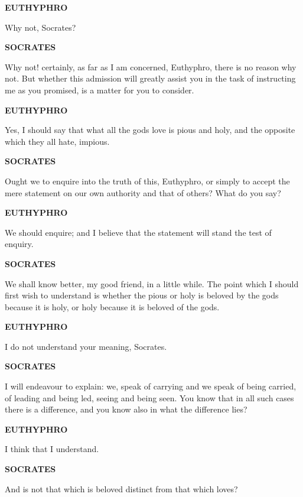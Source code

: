 \documentclass[11pt,letter]{article}
\begin{document}
\par \textbf{EUTHYPHRO}
\par   Why not, Socrates?

\par \textbf{SOCRATES}
\par   Why not! certainly, as far as I am concerned, Euthyphro, there is no reason why not. But whether this admission will greatly assist you in the task of instructing me as you promised, is a matter for you to consider.

\par \textbf{EUTHYPHRO}
\par   Yes, I should say that what all the gods love is pious and holy, and the opposite which they all hate, impious.

\par \textbf{SOCRATES}
\par   Ought we to enquire into the truth of this, Euthyphro, or simply to accept the mere statement on our own authority and that of others? What do you say?

\par \textbf{EUTHYPHRO}
\par   We should enquire; and I believe that the statement will stand the test of enquiry.

\par \textbf{SOCRATES}
\par   We shall know better, my good friend, in a little while. The point which I should first wish to understand is whether the pious or holy is beloved by the gods because it is holy, or holy because it is beloved of the gods.

\par \textbf{EUTHYPHRO}
\par   I do not understand your meaning, Socrates.

\par \textbf{SOCRATES}
\par   I will endeavour to explain:  we, speak of carrying and we speak of being carried, of leading and being led, seeing and being seen. You know that in all such cases there is a difference, and you know also in what the difference lies?

\par \textbf{EUTHYPHRO}
\par   I think that I understand.

\par \textbf{SOCRATES}
\par   And is not that which is beloved distinct from that which loves?
\end{document}
